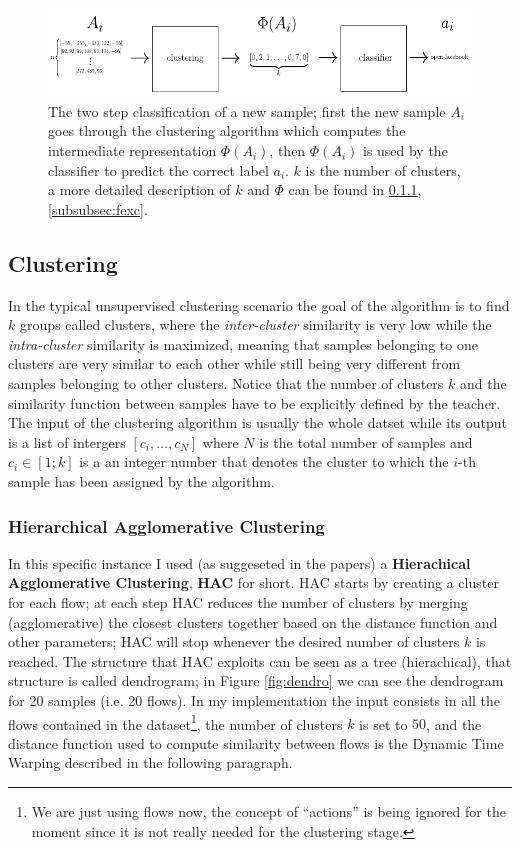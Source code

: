 \begin{figure}[h]
 \centering
 \includegraphics{images/actual}
 \caption{\small{The two step classification of a new sample; first the new sample $A_i$ goes through the clustering algorithm which computes the intermediate representation $\Phi(A_i)$, then $\Phi(A_i)$ is used by the classifier to predict the correct label $a_i$. $k$ is the number of clusters, a more detailed description of $k$ and $\Phi$ can be found in \ref{subsubsec:hac}, \ref{subsubsec:fexc}.}}
 \label{fig:actual}
\end{figure}

\subsection{Clustering}
In the typical unsupervised clustering scenario the goal of the algorithm is to find $k$ groups called clusters, where the \textit{inter-cluster} similarity is very low while the \textit{intra-cluster} similarity is maximized, meaning that samples belonging to one clusters are very similar to each other while still being very different from samples belonging to other clusters. Notice that the number of clusters $k$ and the similarity function between samples have to be explicitly defined by the teacher. The input of the clustering algorithm is usually the whole datset while its output is a list of intergers $[c_i,\dots, c_N]$ where $N$ is the total number of samples and $c_i \in [1;k]$ is a an integer number that denotes the cluster to which the $i$-th sample has been assigned by the algorithm.

\subsubsection{Hierarchical Agglomerative Clustering}
\label{subsubsec:hac}
In this specific instance I used (as suggeseted in the papers) a \textbf{Hierachical Agglomerative Clustering}, \textbf{HAC} for short. HAC starts by creating a cluster for each flow; at each step HAC reduces the number of clusters by merging (agglomerative) the closest clusters together based on the distance function and other parameters; HAC will stop whenever the desired number of clusters $k$ is reached. The structure that HAC exploits can be seen as a tree (hierachical), that structure is called dendrogram; in Figure \ref{fig:dendro} we can see the dendrogram for 20 samples (i.e. 20 flows). In my implementation the input consists in all the flows contained in the dataset\footnote{We are just using flows now, the concept of ``actions'' is being ignored for the moment since it is not really needed for the clustering stage.}, the number of clusters $k$ is set to $50$, and the distance function used to compute similarity between flows is the Dynamic Time Warping described in the following paragraph.

